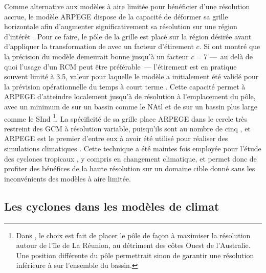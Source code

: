 \documentclass[../main.tex]{subfiles}
\begin{document}
Comme alternative aux modèles à aire limitée pour bénéficier d'une résolution accrue, le modèle ARPEGE dispose de la capacité de déformer sa grille horizontale
afin d'augmenter significativement sa résolution sur une région d'intérêt \parencite{courtier_global_1988}. Pour ce faire, le pôle de la grille est placé sur la
région désirée avant d'appliquer la transformation de \textcite{schmidt_variable_1977} avec un facteur d'étirement $c$. Si \textcite{caian_limits_1997} ont montré que
la précision du modèle demeurait bonne jusqu'à un facteur $c=7$ ---~au delà de quoi l'usage d'un RCM peut être préférable~--- l'étirement est en pratique
souvent limité à \num{3.5}, valeur pour laquelle le modèle a initialement été validé pour la prévision opérationnelle du temps à court terme
\parencite{benichou_validation_1992}. Cette capacité permet à ARPEGE d'atteindre localement jusqu'à  de résolution à l'emplacement du pôle, avec un
minimum de  sur un bassin comme le NAtl \parencite[][c.f \cref{fig:rotated_streched}]{chauvin_future_2020} et de  sur un bassin plus large comme
le SInd \parencite{cattiaux_projected_2020}\footnote{Dans \textcite{cattiaux_projected_2020}, le choix est fait de placer le pôle de façon à maximiser la résolution
autour de l'île de La Réunion, au détriment des côtes Ouest de l'Australie. Une position différente du pôle permettrait sinon de garantir une résolution
inférieure à  sur l'ensemble du bassin.}. La spécificité de sa grille place ARPEGE dans le cercle très restreint des GCM à résolution variable,
puisqu'ils sont au nombre de cinq \parencite{mcgregor_recent_2013}, et ARPEGE est le premier d'entre eux à avoir été utilisé pour réaliser des simulations
climatiques \parencite{deque_high_1995}. Cette technique a été maintes fois employée pour l'étude des cyclones tropicaux
\parencite{chauvin_response_2006,chauvin_atlantic_2017,chauvin_future_2020,daloz_impact_2012,cattiaux_projected_2020}, y compris en changement climatique, et
permet donc de profiter des bénéfices de la haute résolution sur un domaine cible donné sans les inconvénients des modèles à aire limitée.

\subsection{Les cyclones dans les modèles de climat}\label{sec:cyclones_dans_modèles}
\end{document}
